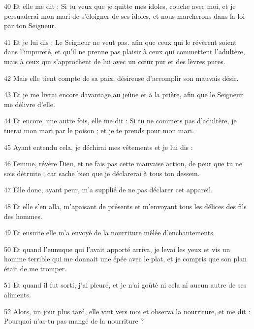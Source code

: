 \par 40 Et elle me dit : Si tu veux que je quitte mes idoles, couche avec moi, et je persuaderai mon mari de s'éloigner de ses idoles, et nous marcherons dans la loi par ton Seigneur.

\par 41 Et je lui dis : Le Seigneur ne veut pas. afin que ceux qui le révèrent soient dans l'impureté, et qu'il ne prenne pas plaisir à ceux qui commettent l'adultère, mais à ceux qui s'approchent de lui avec un cœur pur et des lèvres pures.

\par 42 Mais elle tient compte de sa paix, désireuse d'accomplir son mauvais désir.

\par 43 Et je me livrai encore davantage au jeûne et à la prière, afin que le Seigneur me délivre d'elle.

\par 44 Et encore, une autre fois, elle me dit : Si tu ne commets pas d'adultère, je tuerai mon mari par le poison ; et je te prends pour mon mari.

\par 45 Ayant entendu cela, je déchirai mes vêtements et je lui dis :

\par 46 Femme, révère Dieu, et ne fais pas cette mauvaise action, de peur que tu ne sois détruite ; car sache bien que je déclarerai à tous ton dessein.

\par 47 Elle donc, ayant peur, m'a supplié de ne pas déclarer cet appareil.

\par 48 Et elle s'en alla, m'apaisant de présents et m'envoyant tous les délices des fils des hommes.

\par 49 Et ensuite elle m'a envoyé de la nourriture mêlée d'enchantements.

\par 50 Et quand l'eunuque qui l'avait apporté arriva, je levai les yeux et vis un homme terrible qui me donnait une épée avec le plat, et je compris que son plan était de me tromper.

\par 51 Et quand il fut sorti, j'ai pleuré, et je n'ai goûté ni cela ni aucun autre de ses aliments.

\par 52 Alors, un jour plus tard, elle vint vers moi et observa la nourriture, et me dit : Pourquoi n'as-tu pas mangé de la nourriture ?

